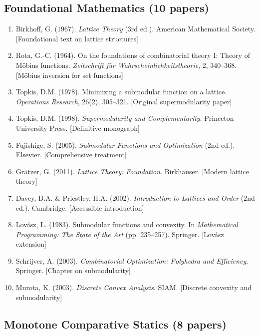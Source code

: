\subsection{Foundational Mathematics (10 papers)}

\begin{enumerate}
    \item Birkhoff, G. (1967). \textit{Lattice Theory} (3rd ed.). American Mathematical Society. [Foundational text on lattice structures]

    \item Rota, G.-C. (1964). On the foundations of combinatorial theory I: Theory of Möbius functions. \textit{Zeitschrift für Wahrscheinlichkeitstheorie}, 2, 340--368. [Möbius inversion for set functions]

    \item Topkis, D.M. (1978). Minimizing a submodular function on a lattice. \textit{Operations Research}, 26(2), 305--321. [Original supermodularity paper]

    \item Topkis, D.M. (1998). \textit{Supermodularity and Complementarity}. Princeton University Press. [Definitive monograph]

    \item Fujishige, S. (2005). \textit{Submodular Functions and Optimization} (2nd ed.). Elsevier. [Comprehensive treatment]

    \item Grätzer, G. (2011). \textit{Lattice Theory: Foundation}. Birkhäuser. [Modern lattice theory]

    \item Davey, B.A. \& Priestley, H.A. (2002). \textit{Introduction to Lattices and Order} (2nd ed.). Cambridge. [Accessible introduction]

    \item Lovász, L. (1983). Submodular functions and convexity. In \textit{Mathematical Programming: The State of the Art} (pp. 235--257). Springer. [Lovász extension]

    \item Schrijver, A. (2003). \textit{Combinatorial Optimization: Polyhedra and Efficiency}. Springer. [Chapter on submodularity]

    \item Murota, K. (2003). \textit{Discrete Convex Analysis}. SIAM. [Discrete convexity and submodularity]
\end{enumerate}

\subsection{Monotone Comparative Statics (8 papers)}

